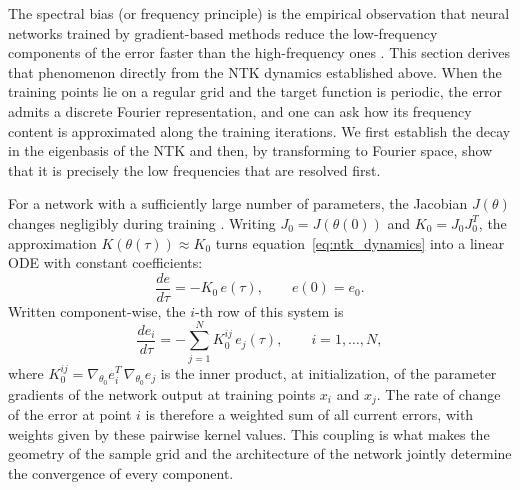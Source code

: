 The spectral bias (or frequency principle) is the empirical observation that neural networks trained by gradient-based methods reduce the low-frequency components of the error faster than the high-frequency ones \parencite{rahaman2019}. This section derives that phenomenon directly from the NTK dynamics established above. When the training points lie on a regular grid and the target function is periodic, the error admits a discrete Fourier representation, and one can ask how its frequency content is approximated along the training iterations. We first establish the decay in the eigenbasis of the NTK and then, by transforming to Fourier space, show that it is precisely the low frequencies that are resolved first.

For a network with a sufficiently large number of parameters, the Jacobian $J(\theta)$ changes negligibly during training \parencite{jacot2018, wang2022ntk}. Writing $J_0 = J(\theta(0))$ and $K_0 = J_0 J_0^T$, the approximation $K(\theta(\tau)) \approx K_0$ turns equation~\eqref{eq:ntk_dynamics} into a linear ODE with constant coefficients:
\begin{equation}\label{eq:error_linear_ode}
    \frac{de}{d\tau} = -K_0\,e(\tau), \qquad e(0) = e_0.
\end{equation}
Written component-wise, the $i$-th row of this system is
\begin{equation}\label{eq:ntk_component}
    \frac{de_i}{d\tau} = -\sum_{j=1}^{N} K_0^{ij}\,e_j(\tau), \qquad i = 1,\ldots,N,
\end{equation}
where $K_0^{ij} = \nabla_{\theta_0} e_i^T\,\nabla_{\theta_0} e_j$ is the inner product, at initialization, of the parameter gradients of the network output at training points $x_i$ and $x_j$. The rate of change of the error at point $i$ is therefore a weighted sum of all current errors, with weights given by these pairwise kernel values. This coupling is what makes the geometry of the sample grid and the architecture of the network jointly determine the convergence of every component.

